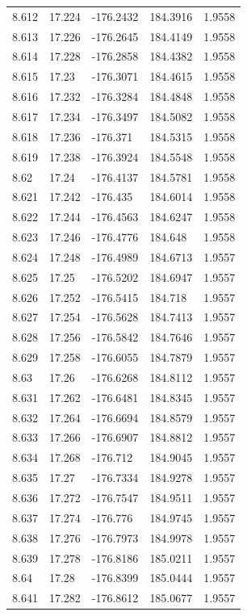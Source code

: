 \begin{tabular}{lllll}
8.612 & 17.224 & -176.2432 & 184.3916 & 1.9558 \\
8.613 & 17.226 & -176.2645 & 184.4149 & 1.9558 \\
8.614 & 17.228 & -176.2858 & 184.4382 & 1.9558 \\
8.615 & 17.23 & -176.3071 & 184.4615 & 1.9558 \\
8.616 & 17.232 & -176.3284 & 184.4848 & 1.9558 \\
8.617 & 17.234 & -176.3497 & 184.5082 & 1.9558 \\
8.618 & 17.236 & -176.371 & 184.5315 & 1.9558 \\
8.619 & 17.238 & -176.3924 & 184.5548 & 1.9558 \\
8.62 & 17.24 & -176.4137 & 184.5781 & 1.9558 \\
8.621 & 17.242 & -176.435 & 184.6014 & 1.9558 \\
8.622 & 17.244 & -176.4563 & 184.6247 & 1.9558 \\
8.623 & 17.246 & -176.4776 & 184.648 & 1.9558 \\
8.624 & 17.248 & -176.4989 & 184.6713 & 1.9557 \\
8.625 & 17.25 & -176.5202 & 184.6947 & 1.9557 \\
8.626 & 17.252 & -176.5415 & 184.718 & 1.9557 \\
8.627 & 17.254 & -176.5628 & 184.7413 & 1.9557 \\
8.628 & 17.256 & -176.5842 & 184.7646 & 1.9557 \\
8.629 & 17.258 & -176.6055 & 184.7879 & 1.9557 \\
8.63 & 17.26 & -176.6268 & 184.8112 & 1.9557 \\
8.631 & 17.262 & -176.6481 & 184.8345 & 1.9557 \\
8.632 & 17.264 & -176.6694 & 184.8579 & 1.9557 \\
8.633 & 17.266 & -176.6907 & 184.8812 & 1.9557 \\
8.634 & 17.268 & -176.712 & 184.9045 & 1.9557 \\
8.635 & 17.27 & -176.7334 & 184.9278 & 1.9557 \\
8.636 & 17.272 & -176.7547 & 184.9511 & 1.9557 \\
8.637 & 17.274 & -176.776 & 184.9745 & 1.9557 \\
8.638 & 17.276 & -176.7973 & 184.9978 & 1.9557 \\
8.639 & 17.278 & -176.8186 & 185.0211 & 1.9557 \\
8.64 & 17.28 & -176.8399 & 185.0444 & 1.9557 \\
8.641 & 17.282 & -176.8612 & 185.0677 & 1.9557 \\

\end{tabular}
